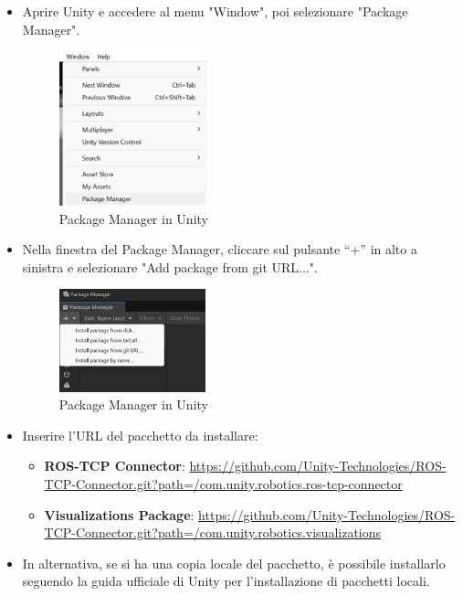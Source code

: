 \documentclass[11pt]{report}
\begin{document}
\begin{itemize}
    \item Aprire Unity e accedere al menu "Window", poi selezionare "Package Manager".
    \begin{figure}[h]
        \centering
        \includegraphics[width=0.4\textwidth]{images/rostcp.jpg}
        \caption{Package Manager in Unity}
        \label{fig:rostcp}
    \end{figure}
    
    \item Nella finestra del Package Manager, cliccare sul pulsante “+” in alto a sinistra e selezionare "Add package from git URL...".
    \begin{figure}[h]
        \centering
        \includegraphics[width=0.4\textwidth]{images/rostcp1.jpg}
        \caption{Package Manager in Unity}
        \label{fig:rostcp1}
    \end{figure}

    \item Inserire l’URL del pacchetto da installare:
    \begin{itemize}
        \item \textbf{ROS-TCP Connector}: 
        \url{https://github.com/Unity-Technologies/ROS-TCP-Connector.git?path=/com.unity.robotics.ros-tcp-connector}
        \item \textbf{Visualizations Package}: 
        \url{https://github.com/Unity-Technologies/ROS-TCP-Connector.git?path=/com.unity.robotics.visualizations}
    \end{itemize}
    
    \item In alternativa, se si ha una copia locale del pacchetto, è possibile installarlo seguendo la guida ufficiale di Unity per l’installazione di pacchetti locali.
\end{itemize}
\end{document}
